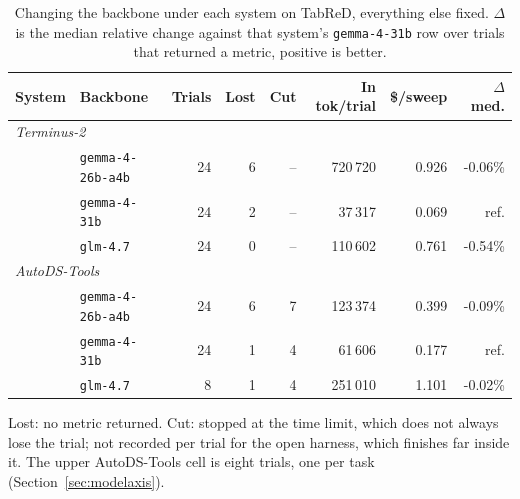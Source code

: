 \begin{table}[t]
\centering
\caption{Changing the backbone under each system on TabReD, everything else fixed. $\Delta$ is the median relative change against that system's \texttt{gemma-4-31b} row over trials that returned a metric, positive is better.}
\label{tab:modelaxis}
\small
\setlength{\tabcolsep}{4pt}
\begin{tabular}{llrrrrrr}
\toprule
System & Backbone & Trials & Lost & Cut & In tok/trial & \$/sweep & $\Delta$ med. \\
\midrule
\multicolumn{8}{l}{\itshape Terminus-2} \\
 & \texttt{gemma-4-26b-a4b} & 24 & 6 & -- & 720\,720 & 0.926 & -0.06\% \\
 & \texttt{gemma-4-31b} & 24 & 2 & -- & 37\,317 & 0.069 & ref. \\
 & \texttt{glm-4.7} & 24 & 0 & -- & 110\,602 & 0.761 & -0.54\% \\
\midrule
\multicolumn{8}{l}{\itshape AutoDS-Tools} \\
 & \texttt{gemma-4-26b-a4b} & 24 & 6 & 7 & 123\,374 & 0.399 & -0.09\% \\
 & \texttt{gemma-4-31b} & 24 & 1 & 4 & 61\,606 & 0.177 & ref. \\
 & \texttt{glm-4.7} & 8 & 1 & 4 & 251\,010 & 1.101 & -0.02\% \\
\bottomrule
\end{tabular}
\par\smallskip
\begin{minipage}{0.95\linewidth}\footnotesize Lost: no metric returned. Cut: stopped at the time limit, which does not always lose the trial; not recorded per trial for the open harness, which finishes far inside it. The upper AutoDS-Tools cell is eight trials, one per task (Section~\ref{sec:modelaxis}).\end{minipage}
\end{table}
